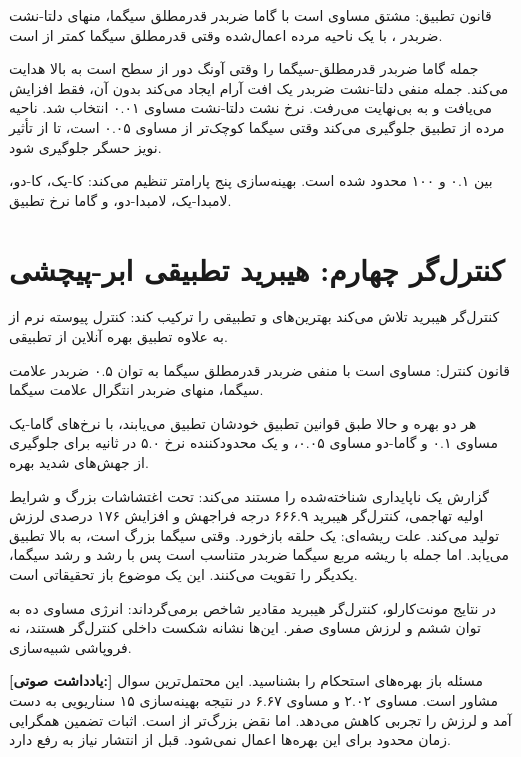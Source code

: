 \documentclass[12pt, a4paper]{article}
\newcommand{\dash}{\lr{---}}
\begin{document}
قانون تطبيق: مشتق  مساوی است با گاما ضربدر قدرمطلق سيگما، منهای دلتا-نشت ضربدر ، با يک ناحيه مرده اعمال‌شده وقتی قدرمطلق سيگما کمتر از  است.

جمله گاما ضربدر قدرمطلق-سيگما  را وقتی آونگ دور از سطح است به بالا هدايت می‌کند. جمله منفی دلتا-نشت ضربدر  يک افت آرام ايجاد می‌کند \dash{} بدون آن،  فقط افزايش می‌يافت و به بی‌نهايت می‌رفت. نرخ نشت دلتا-نشت مساوی ۰.۰۱ انتخاب شد. ناحيه مرده از تطبيق جلوگيری می‌کند وقتی سيگما کوچک‌تر از  مساوی ۰.۰۵ است، تا از تأثير نويز حسگر جلوگيری شود.

 بين ۰.۱ و ۱۰۰ محدود شده است. بهينه‌سازی پنج پارامتر تنظيم می‌کند: کا-يک، کا-دو، لامبدا-يک، لامبدا-دو، و گاما نرخ تطبيق.

\section{کنترل‌گر چهارم: هيبريد تطبيقی ابر-پيچشی}

کنترل‌گر هيبريد تلاش می‌کند بهترين‌های  و تطبيقی را ترکيب کند: کنترل پيوسته نرم از  به علاوه تطبيق بهره آنلاين از تطبيقی.

قانون کنترل:  مساوی است با منفی  ضربدر قدرمطلق سيگما به توان ۰.۵ ضربدر علامت سيگما، منهای  ضربدر انتگرال علامت سيگما.

هر دو بهره  و  حالا طبق قوانين تطبيق خودشان تطبيق می‌يابند، با نرخ‌های گاما-يک مساوی ۰.۱ و گاما-دو مساوی ۰.۰۵، و يک محدودکننده نرخ ۵.۰ در ثانيه برای جلوگيری از جهش‌های شديد بهره.

گزارش يک ناپايداری شناخته‌شده را مستند می‌کند: تحت اغتشاشات بزرگ و شرايط اوليه تهاجمی، کنترل‌گر هيبريد ۶۶۶.۹ درجه فراجهش و افزايش ۱۷۶ درصدی لرزش توليد می‌کند. علت ريشه‌ای: يک حلقه بازخورد. وقتی سيگما بزرگ است،  به بالا تطبيق می‌يابد. اما جمله  با ريشه مربع سيگما ضربدر  متناسب است \dash{} پس با رشد  و رشد سيگما، يکديگر را تقويت می‌کنند. اين يک موضوع باز تحقيقاتی است.

در نتايج مونت‌کارلو، کنترل‌گر هيبريد مقادير شاخص برمی‌گرداند: انرژی مساوی ده به توان ششم و لرزش مساوی صفر. اين‌ها نشانه شکست داخلی کنترل‌گر هستند، نه فروپاشی شبيه‌سازی.


\begin{mdframed}[
  backgroundcolor=audiotan,
  linecolor=audionote!70,
  linewidth=1pt,
  innerleftmargin=12pt,
  innerrightmargin=12pt,
  innertopmargin=8pt,
  innerbottommargin=8pt
]
\textbf{\color{audionote}[يادداشت صوتی:]}
مسئله باز بهره‌های استحکام  را بشناسيد. اين محتمل‌ترين سوال مشاور است.  مساوی ۲.۰۲ و  مساوی ۶.۶۷ در نتيجه بهينه‌سازی ۱۵ سناريويی به دست آمد و لرزش را تجربی کاهش می‌دهد. اما نقض  بزرگ‌تر از  است. اثبات تضمين همگرايی زمان محدود برای اين بهره‌ها اعمال نمی‌شود. قبل از انتشار نياز به رفع دارد.
\end{mdframed}
\end{document}
